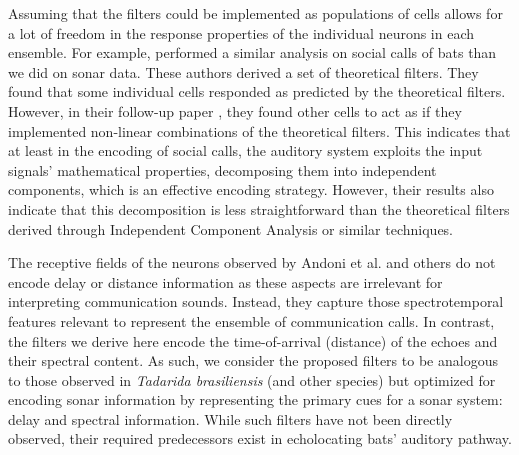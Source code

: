 \documentclass[10pt,letterpaper]{article}
\begin{document}
Assuming that the filters could be implemented as populations of cells allows for a lot of freedom in the response properties of the individual neurons in each ensemble. For example, \cite{Andoni2007} performed a similar analysis on social calls of bats than we did on sonar data. These authors derived a set of theoretical filters. They found that some individual cells responded as predicted by the theoretical filters. However, in their follow-up paper \cite{Andoni2011}, they found other cells to act as if they implemented non-linear combinations of the theoretical filters. This indicates that at least in the encoding of social calls, the auditory system exploits the input signals' mathematical properties, decomposing them into independent components, which is an effective encoding strategy. However, their results also indicate that this decomposition is less straightforward than the theoretical filters derived through Independent Component Analysis or similar techniques. 

The receptive fields of the neurons observed by Andoni et al.  \cite{Andoni2007} and others do not encode delay or distance information as these aspects are irrelevant for interpreting communication sounds. Instead, they capture those spectrotemporal features relevant to represent the ensemble of communication calls. In contrast, the filters we derive here encode the time-of-arrival (distance) of the echoes and their spectral content. As such, we consider the proposed filters to be analogous to those observed in \textit{Tadarida brasiliensis} (and other species) but optimized for encoding sonar information by representing the primary cues for a sonar system: delay and spectral information. While such filters have not been directly observed, their required predecessors exist in echolocating bats' auditory pathway. 
\end{document}
